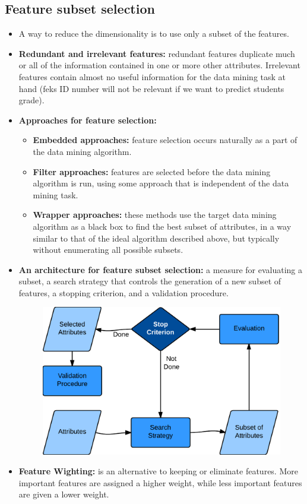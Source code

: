 	\clearpage
	\subsection*{Feature subset selection}
		\begin{itemize}
			\item A way to reduce the dimensionality is to use only a subset of the 
			features.
			\item {\bf Redundant and irrelevant features:} redundant features duplicate much 
			or all of the information contained in one or more other attributes. Irrelevant
			features contain almost no useful information for the data mining task at hand
			(feks ID number will not be relevant if we want to predict students grade).
			\item {\bf Approaches for feature selection:}
				\begin{itemize}
					\item {\bf Embedded approaches:} feature selection occurs naturally as
					a part of the data mining algorithm.
					\item {\bf Filter approaches:} features are selected before the data
					mining algorithm is run, using some approach that is independent of the
					data mining task. 
					\item {\bf Wrapper approaches:} these methods use the target data mining
					algorithm as a black box to find the best subset of attributes, in a way
					similar to that of the ideal algorithm described above, but typically 
					without enumerating all possible subsets. 
				\end{itemize}
			\item{\bf An architecture for feature subset selection:} 
			a measure for evaluating a subset, a search strategy that controls the generation 
			of a new subset of features, a stopping criterion, and a validation procedure.
				\begin{figure}[H]
					\centering
					\includegraphics[scale=0.2]{pics/featureSelection.png}
				\end{figure} 
			\item{\bf Feature Wighting:} is an alternative to keeping or eliminate features.
			More important features are assigned a higher weight, while less important
			features are given a lower weight. 
		\end{itemize}

